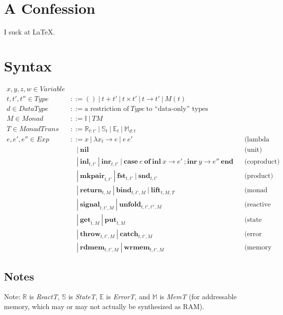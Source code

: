 \documentclass{article}[11pt]
\begin{document}
\section{A Confession}
I suck at \LaTeX.

\section{Syntax}
$$
\begin{aligned}
x,y,z,w \in \mathit{Variable}\\
t,t',t'' \in \mathit{Type} &::= ()~ |~ t + t'~ |~ t \times t'~ |~ t \rightarrow t'~ |~ M(t)\\
d \in \mathit{DataType} &::= \text{a restriction of}~ \mathit{Type}~ \text{to ``data-only'' types}\\
M \in \mathit{Monad} &::= \mathbb{I}~ |~ T M\\
T \in \mathit{MonadTrans} &::= \mathbb{R}_{t:t'}~ |~ \mathbb{S}_t~ |~ \mathbb{E}_t~ |~ \mathbb{M}_{d:t}\\
e,e',e'' \in \mathit{Exp}&::= x~ |~ \lambda{}x_t\rightarrow{}e~ |~ e~ e'&&\text{(lambda calculus)}\\
  &~~~~|~ \textbf{nil}&&\text{(unit)}\\
  &~~~~|~ \textbf{inl}_{t,t'}~ |~ \textbf{inr}_{t,t'}~ |~ \textbf{case}~ e~ \textbf{of}~ \textbf{inl}~ x \rightarrow e'~ ; \textbf{inr}~ y \rightarrow e''~ \textbf{end}&&\text{(coproduct)}\\
  &~~~~|~ \textbf{mkpair}_{t,t'}~ |~ \mathbf{fst}_{t,t'}~ |~ \mathbf{snd}_{t,t'}&&\text{(product)}\\
  &~~~~|~ \textbf{return}_{t,M}~ |~ \textbf{bind}_{t,t',M}~ |~ \textbf{lift}_{t,M,T}&&\text{(monad operators)}\\
  &~~~~|~ \textbf{signal}_{t,t',M}~ |~ \mathbf{unfold}_{t,t',t'',M}&&\text{(reactive prims.)}\\
  &~~~~|~ \textbf{get}_{t,M}~ |~ \textbf{put}_{t,M}&&\text{(state prims.)}\\
  &~~~~|~ \textbf{throw}_{t,t',M}~ |~ \textbf{catch}_{t,t',M}&&\text{(error prims.)}\\
  &~~~~|~ \textbf{rdmem}_{t,t',M}~ |~ \textbf{wrmem}_{t,t',M}&&\text{(memory prims.)}
\end{aligned}
$$

\subsection{Notes}
Note: $\mathbb{R}$ is {\it ReactT}, $\mathbb{S}$ is {\it StateT}, $\mathbb{E}$ is {\it ErrorT}, and $\mathbb{M}$ is {\it MemT} (for addressable memory, which may or may not actually be synthesized as RAM).
\end{document}
